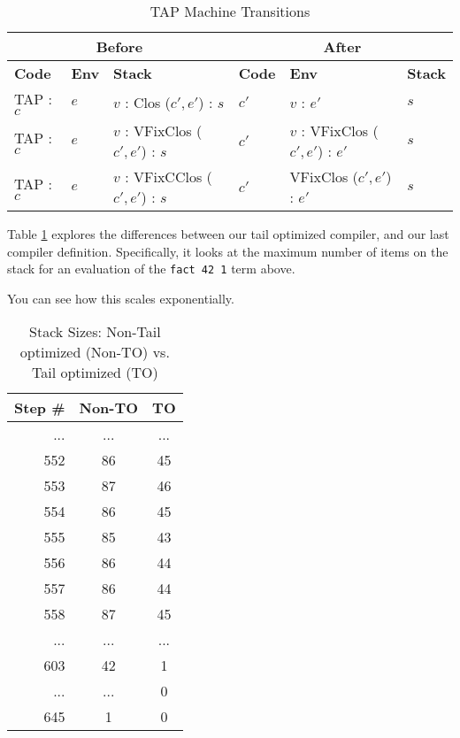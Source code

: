 \begin{table}[h]
    \centering
    \small
    \begin{tabular}{|l|l|l||l|l|l|}
        \hline
        \multicolumn{3}{|c||}{\textbf{Before}} & \multicolumn{3}{c|}{\textbf{After}} \\
        \hline
        \textbf{Code} & \textbf{Env} & \textbf{Stack} & \textbf{Code} & \textbf{Env} & \textbf{Stack} \\
        \hline
        TAP : \(c\) & \( e \) & \( v \) : Clos (\( c' , e' \)) : \( s \) & \( c' \) & \( v \) : \( e' \) & \( s \) \\
        TAP : \(c\) & \( e \) & \( v \) : VFixClos (\( c' , e' \)) : \( s \) & \( c' \) & \( v \) : VFixClos (\( c' , e' \)) : \( e' \) & \( s \) \\
        TAP : \(c\) & \( e \) & \( v \) : VFixCClos (\( c' , e' \)) : \( s \) & \( c' \) & VFixClos (\( c' , e' \)) : \( e' \) & \( s \) \\
        \hline
    \end{tabular}
    \caption{TAP Machine Transitions}
\end{table}

\newpage

Table \ref{table:stacks} explores the differences between our tail optimized compiler, and our last compiler definition. Specifically, it looks
at the maximum number of items on the stack for an evaluation of the \texttt{fact 42 1} term above.

You can see how this scales exponentially.

\begin{table}[h]
    \centering
    \small
    \begin{tabular}{|r||c|c|}
        \hline
        Step \# & Non-TO & TO \\
        \hline \hline
        ... & ... & ... \\
        \hline
        552 & 86 & 45 \\
        \hline
        553 & 87 & 46 \\
        \hline
        554 & 86 & 45 \\
        \hline
        555 & 85 & 43 \\
        \hline
        556 & 86 & 44 \\
        \hline
        557 & 86 & 44 \\
        \hline
        558 & 87 & 45 \\
        \hline
        ... & ... & ... \\
        \hline
        603 & 42 & 1 \\
        \hline
        ... & ... & 0 \\
        \hline
        645 & 1 & 0 \\
        \hline
    \end{tabular}
    \caption{Stack Sizes: Non-Tail optimized (Non-TO) vs. Tail optimized (TO)}
    \label{table:stacks}
\end{table}
